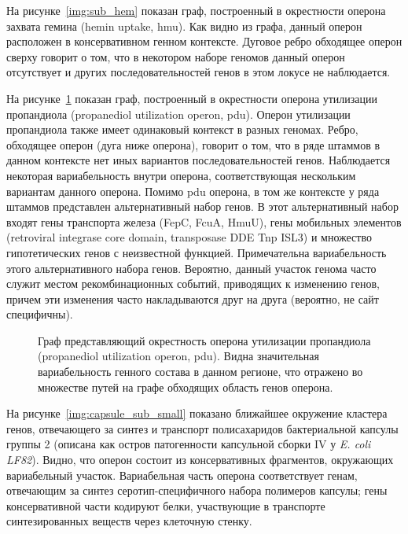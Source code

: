 На рисунке~\ref{img:sub_hem} показан граф, построенный в окрестности оперона захвата гемина (hemin uptake, hmu). Как видно из графа, данный оперон расположен в консервативном генном контексте. Дуговое ребро обходящее оперон сверху говорит о том, что в некотором наборе геномов данный оперон отсутствует и других последовательностей генов в этом локусе не наблюдается. 

На рисунке~\ref{img:sub_pdu} показан граф, построенный в окрестности оперона утилизации пропандиола (propanediol utilization operon, pdu). Оперон утилизации пропандиола также имеет одинаковый контекст в разных геномах. Ребро, обходящее оперон (дуга ниже оперона), говорит о том, что в ряде штаммов в данном контексте нет иных вариантов последовательностей генов. Наблюдается некоторая вариабельность внутри оперона, соответствующая нескольким вариантам данного оперона. Помимо pdu оперона, в том же контексте у ряда штаммов представлен альтернативный набор генов. В этот альтернативный набор входят гены транспорта железа (FepC, FcuA, HmuU), гены мобильных элементов (retroviral integrase core domain, transposase DDE Tnp ISL3) и множество гипотетических генов с неизвестной функцией. Примечательна вариабельность этого альтернативного набора генов. Вероятно, данный участок генома часто служит местом рекомбинационных событий, приводящих к изменению генов, причем эти изменения часто накладываются друг на друга (вероятно, не сайт специфичны). 


\begin{figure}[!ht] 
  \center
  \setlength{\fboxsep}{10pt}%
  \setlength{\fboxrule}{0pt}%
  \caption{Граф представляющий окрестность оперона утилизации пропандиола (propanediol utilization operon, pdu). Видна значительная вариабельность генного состава в данном регионе, что отражено во множестве путей на графе обходящих область генов оперона.}
  \label{img:sub_pdu} 
\end{figure}

На рисунке~\ref{img:capsule_sub_small} показано ближайшее окружение кластера генов, отвечающего за синтез и транспорт полисахаридов бактериальной капсулы группы 2 (описана как остров патогенности капсульной сборки IV у \textit{E. coli LF82}). Видно, что оперон состоит из консервативных фрагментов, окружающих вариабельный участок. Вариабельная часть оперона соответствует генам, отвечающим за синтез серотип-специфичного набора полимеров капсулы; гены консервативной части кодируют белки, участвующие в транспорте синтезированных веществ через клеточную стенку.


